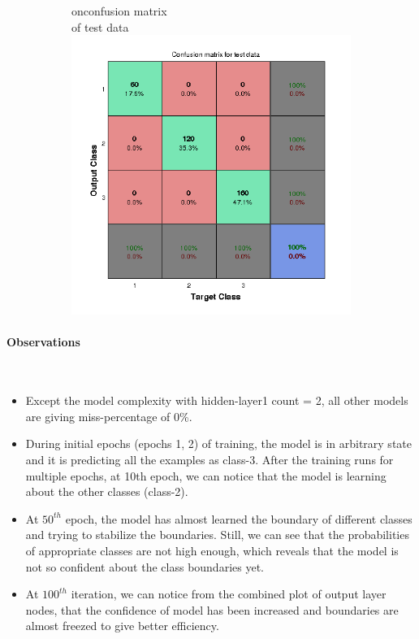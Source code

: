 \documentclass[fleqn]{article}
\newcommand{\myparagraph}[1]{\paragraph{#1}\mbox{}\\}
\begin{document}
\begin{figure}[!ht]
\begin{subfigure}{.5\textwidth}
on{confusion matrix \\ of test data}
\includegraphics[scale=0.5]{./pics/nonlinearlyseparable/_4_2/_4_2_epoch_Inf_confusiontest}
\end{subfigure}
\end{figure}

\myparagraph{Observations}

\begin{itemize}
  \item Except the model complexity with hidden-layer1 count = 2, all other models are giving miss-percentage of 0\%.
  \item During initial epochs (epochs 1, 2) of training, the model is in arbitrary state and it is predicting all the examples as class-3. After the training runs for multiple epochs, at 10th epoch, we can notice that the model is learning about the other classes (class-2).
  \item At $50^{th}$ epoch, the model has almost learned the boundary of different classes and trying to stabilize the boundaries. Still, we can see that the probabilities of appropriate classes are not high enough, which reveals that the model is not so confident about the class boundaries yet.
  \item At $100^{th}$ iteration, we can notice from the combined plot of output layer nodes, that the confidence of model has been increased and boundaries are almost freezed to give better efficiency.
\end{itemize}
\end{document}
